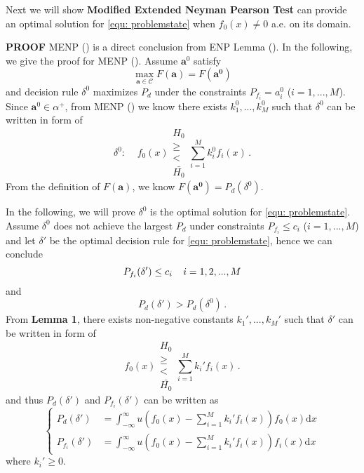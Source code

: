 Next we will show \textbf{Modified Extended Neyman Pearson Test} can provide an optimal solution for \eqref{equ: problemstate} when $f_0(x) \neq 0$ a.e. on its domain.

\textbf{PROOF}
MENP () is a direct conclusion from ENP Lemma (). In the following,  we give the proof for MENP (). Assume $\mathbf{a}^0$ satisfy
\begin{equation}
\label{a0}
\max_{\mathbf{a}\in\mathcal{C}} F(\mathbf{a}) = F(\mathbf{a^0})
\end{equation}
and decision rule $\delta^0$ maximizes $P_d$ under the constraints $P_{f_i} = a^0_i$ ($i = 1, ..., M$). Since $\mathbf{a}^0 \in \alpha^+$, from MENP () we know there exists $k_1^0, ..., k_M^0$ such that $\delta^0$ can be written in form of 
\[
\delta^0:\;\;\;\;f_0(x) \substack{H_0 \\ \geq \\ < \\ \bar{H_0}} \sum_{i=1}^{M}k_i^0f_i(x)\,.
\] 
From the definition of $F(\mathbf{a})$, we know $F(\mathbf{a^0}) = P_d(\delta^0)$.

In the following, we  will prove $\delta^0$ is the optimal solution for \eqref{equ: problemstate}. 
Assume  $\delta^0$ does not achieve the largest $P_d$ under constraints $P_{f_i} \leq c_i$ ($i=1, ..., M$) and let $\delta'$ be the optimal decision rule for \eqref{equ: problemstate}, hence  we can conclude
\begin{equation}
\label{condition 1}
P_{f_i}(\delta') \leq c_i\;\;\;\;i=1, 2, ..., M\\
\end{equation}
and
\begin{equation}
\label{condition 2}
P_{d}(\delta') > P_d(\delta^0)\,.
\end{equation}
From \textbf{Lemma 1}, there exists non-negative constants $k_1', ..., k_M'$ such that $\delta'$ can be written in form of 
\begin{equation}
f_0(x) \substack{H_0 \\ \geq \\ < \\ \bar{H_0}} \sum_{i=1}^{M}k_i'f_i(x)\,.
\label{2015feb20a1}
\end{equation}
and thus $P_d(\delta')$ and $P_{f_i}(\delta')$ can be written as
\begin{equation}
\begin{cases}
\label{TEMP10}
P_{d}(\delta') &= \int_{-\infty}^{\infty} u(f_0(x) - \sum_{i=1}^{M}k_i'f_i(x)) f_0(x) \mathrm{d}x\\
P_{f_i}(\delta') &= \int_{-\infty}^{\infty} u(f_0(x) - \sum_{i=1}^{M}k_i'f_i(x)) f_i(x) \mathrm{d}x
\end{cases}
\end{equation}
where $k_i' \geq 0$.

